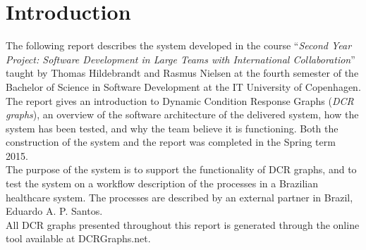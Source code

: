 \section{Introduction}
The following report describes the system developed in the course “\textit{Second Year Project: Software Development in Large Teams with International Collaboration}” taught by Thomas Hildebrandt and Rasmus Nielsen at the fourth semester of the Bachelor of Science in Software Development at the IT University of Copenhagen.\\

The report gives an introduction to Dynamic Condition Response Graphs (\textit{DCR graphs}), an overview of the software architecture of the delivered system, how the system has been tested, and why the team believe it is functioning. Both the construction of the system and the report was completed in the Spring term 2015.\\

The purpose of the system is to support the functionality of DCR graphs, and to test the system on a workflow description of the processes in a Brazilian healthcare system. The processes are described by an external partner in Brazil, Eduardo A. P. Santos. \\

All DCR graphs presented throughout this report is generated through the online tool available at DCRGraphs.net.

